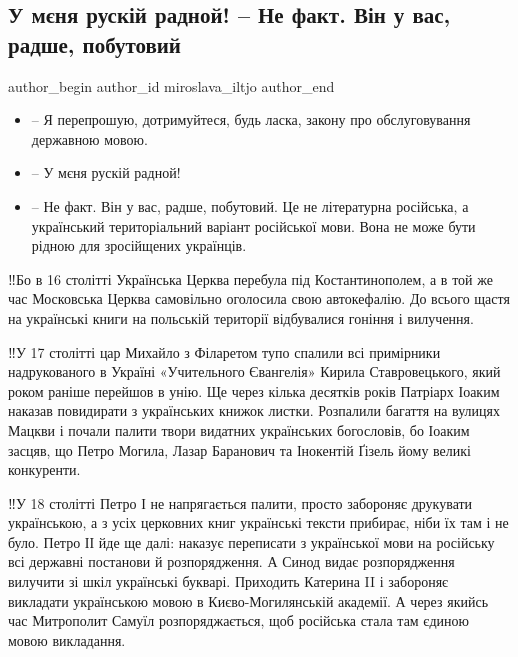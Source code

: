  
 
 
 
 
 
\subsection{У мєня рускій радной! – Не факт. Він у вас, радше, побутовий}
\label{sec:25_07_2021.fb.miroslava_iltjo.1.mova_zakon_jazyk_rodnoj}
 
\ifcmt
 author_begin
   author_id miroslava_iltjo
 author_end
\fi

\begin{itemize}
\item – Я перепрошую, дотримуйтеся, будь ласка, закону про обслуговування державною мовою.
\item – У мєня рускій радной!
\item – Не факт. Він у вас, радше, побутовий. Це не літературна російська, а
український територіальний варіант російської мови. Вона не може бути рідною
для зросійщених українців.
\end{itemize}

‼️Бо в 16 столітті Українська Церква перебула під Костантинополем, а в той же
час Московська Церква самовільно оголосила свою автокефалію. До всього щастя на
українські книги на польській території відбувалися гоніння і вилучення.

‼️У 17 столітті цар Михайло з Філаретом тупо спалили всі примірники
надрукованого в Україні «Учительного Євангелія» Кирила Ставровецького, який
роком раніше перейшов в унію. Ще через кілька десятків років Патріарх Іоаким
наказав повидирати з українських книжок листки. Розпалили багаття на вулицях
Мацкви і почали палити твори видатних українських богословів, бо Іоаким засцяв,
що Петро Могила, Лазар Баранович та Інокентій Ґізель йому великі конкуренти.

‼️У 18 столітті Петро І не напрягається палити, просто забороняє друкувати
українською, а з усіх церковних книг українські тексти прибирає, ніби їх там і
не було. Петро ІІ йде ще далі: наказує переписати з української мови на
російську всі державні постанови й розпорядження. А Синод видає розпорядження
вилучити зі шкіл українські букварі. Приходить Катерина II і забороняє
викладати українською мовою в Києво-Могилянській академії. А через якийсь час
Митрополит Самуїл розпоряджається, щоб  російська стала там єдиною мовою
викладання.

